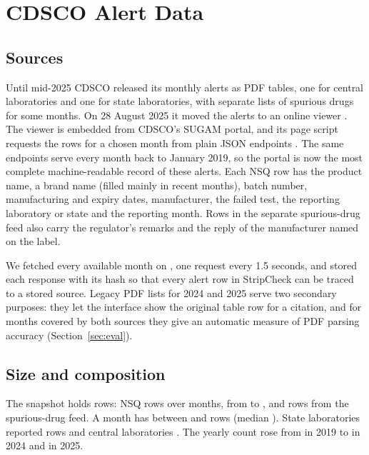 \section{CDSCO Alert Data}
\label{sec:data}

\subsection{Sources}
Until mid-2025 CDSCO released its monthly alerts as PDF tables, one for central laboratories and one for state laboratories, with separate lists of spurious drugs for some months. On 28 August 2025 it moved the alerts to an online viewer \cite{cdsco2025nsqlink,cdsco2026nsqpage}. The viewer is embedded from CDSCO's SUGAM portal, and its page script requests the rows for a chosen month from plain JSON endpoints \cite{cdsco2026portal}. The same endpoints serve every month back to January 2019, so the portal is now the most complete machine-readable record of these alerts. Each NSQ row has the product name, a brand name (filled mainly in recent months), batch number, manufacturing and expiry dates, manufacturer, the failed test, the reporting laboratory or state and the reporting month. Rows in the separate spurious-drug feed also carry the regulator's remarks and the reply of the manufacturer named on the label.

We fetched every available month on \SnapshotDate{}, one request every 1.5 seconds, and stored each response with its hash so that every alert row in StripCheck can be traced to a stored source. Legacy PDF lists for 2024 and 2025 serve two secondary purposes: they let the interface show the original table row for a citation, and for months covered by both sources they give an automatic measure of PDF parsing accuracy (Section~\ref{sec:eval}).

\subsection{Size and composition}
The snapshot holds \NumAlertRows{} rows: \NumNsqRows{} NSQ rows over \NumMonths{} months, from \FirstMonth{} to \LastMonth{}, and \NumSpuriousTabRows{} rows from the spurious-drug feed. A month has between \RowsPerMonthMin{} and \RowsPerMonthMax{} rows (median \RowsPerMonthMedian{}). State laboratories reported \RowsStateLabs{} rows and central laboratories \RowsCentralLabs{}. The yearly count rose from \RowsYearFirst{} in 2019 to \RowsYearTwentyFour{} in 2024 and \RowsYearTwentyFive{} in 2025. 

